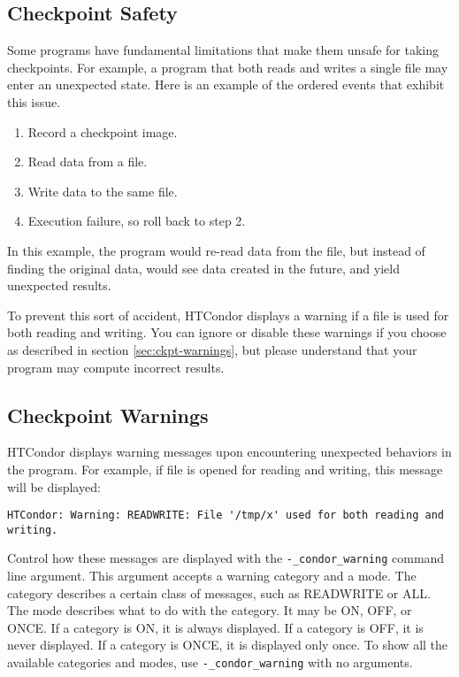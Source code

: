 \subsection{\label{sec:ckpt-safety}Checkpoint Safety}

Some programs have fundamental limitations that make them
unsafe for taking checkpoints.
For example, a program that both reads
and writes a single file may enter an unexpected state. Here
is an example of the ordered events that exhibit this issue.

\begin{enumerate}
\item Record a checkpoint image.
\item Read data from a file.
\item Write data to the same file.
\item Execution failure, so roll back to step 2.
\end{enumerate}

In this example, the program would re-read data from the file, but
instead of finding the original data, would see data created in the
future, and yield unexpected results.

To prevent this sort of accident, HTCondor displays a warning
if a file is used for both reading and writing.  You can ignore or disable
these warnings if you choose as described in  section \ref{sec:ckpt-warnings},
but please understand that your program may compute incorrect results.

\subsection{\label{sec:ckpt-warnings}Checkpoint Warnings}

HTCondor displays warning messages upon encountering unexpected
behaviors in the program.  For example, if file 
is opened for reading
and writing, this message will be displayed:

\footnotesize
\begin{verbatim}
HTCondor: Warning: READWRITE: File '/tmp/x' used for both reading and writing.
\end{verbatim}
\normalsize

Control how these messages are displayed with the
\verb$-_condor_warning$ command line argument.  This argument
accepts a warning category and a mode.  The category describes a certain
class of messages, such as READWRITE or ALL.  The mode describes what
to do with the category.  It may be ON, OFF, or ONCE.
If a category is ON, it is always displayed.
If a category is OFF, it is never displayed.
If a category is ONCE, it is displayed only once.
To show all the available categories and modes, use
\verb$-_condor_warning$ with no arguments.

